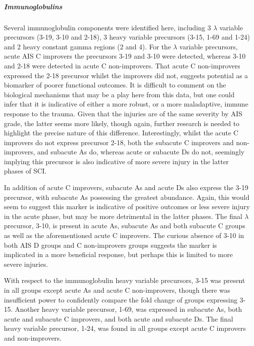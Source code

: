 \documentclass[
]{article}
\begin{document}
\hypertarget{immunoglobulins}{%
\subparagraph{Immunoglobulins}\label{immunoglobulins}}

Several immunoglobulin components were identified here, including 3 \(\lambda\) variable precursors (3-19, 3-10 and 2-18), 3 heavy variable precursors (3-15, 1-69 and 1-24) and 2 heavy constant gamma regions (2 and 4).
For the \(\lambda\) variable precursors, acute AIS C improvers the precursors 3-19 and 3-10 were detected, whereas 3-10 and 2-18 were detected in acute C non-improvers.
That acute C non-improvers expressed the 2-18 precursor whilst the improvers did not, suggests potential as a biomarker of poorer functional outcomes.
It is difficult to comment on the biological mechanisms that may be a play here from this data, but one could infer that it is indicative of either a more robust, or a more maladaptive, immune response to the trauma.
Given that the injuries are of the same severity by AIS grade, the latter seems more likely, though again, further research is needed to highlight the precise nature of this difference.
Interestingly, whilst the acute C improvers do not express precursor 2-18, both the subacute C improvers and non-improvers, and subacute As do, whereas acute or subacute Ds do not, seemingly implying this precursor is also indicative of more severe injury in the latter phases of SCI.

In addition of acute C improvers, subacute As and acute Ds also express the 3-19 precursor, with subacute As possessing the greatest abundance.
Again, this would seem to suggest this marker is indicative of positive outcomes or less severe injury in the acute phase, but may be more detrimental in the latter phases.
The final \(\lambda\) precursor, 3-10, is present in acute As, subacute As and both subacute C groups as well as the aforementioned acute C improvers.
The curious absence of 3-10 in both AIS D groups and C non-improvers groups suggests the marker is implicated in a more beneficial response, but perhaps this is limited to more severe injuries.

With respect to the immunoglobulin heavy variable precursors, 3-15 was present in all groups except acute As and acute C non-improvers, though there was insufficient power to confidently compare the fold change of groups expressing 3-15.
Another heavy variable precursor, 1-69, was expressed in subacute As, both acute and subacute C improvers, and both acute and subacute Ds.
The final heavy variable precursor, 1-24, was found in all groups except acute C improvers and non-improvers.
\end{document}
